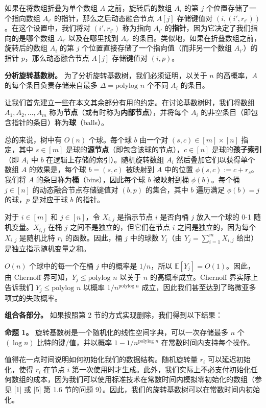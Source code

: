 \documentclass[12pt,a4paper]{ctexart}
\theoremstyle{remark}
\begin{document}
如果在将数组折叠为单个数组 $A$ 之前，旋转后的数组 $A_i$ 的第 $j$ 个位置存储了一个指向数组 $A_{i'}$ 的指针，那么之后动态融合节点 $A[j]$ 存储键值对 $(i,(i',r_{i'}))$。在这个设置中，我们将对 $(i',r_{i'})$ 称为指向 $A_{i'}$ 的\textbf{指针}，因为它决定了我们指向的是哪个数组 $A_{i'}$ 以及在哪里找到 $A_{i'}$ 的条目。类似地，如果在折叠数组之前，旋转后的数组 $A_i$ 的第 $j$ 个位置直接存储了一个指向值（而非另一个数组 $A_{i'}$）的指针 $p$，那么动态融合节点 $A[j]$ 存储键值对 $(i,p)$。

\textbf{分析旋转基数树。} 为了分析旋转基数树，我们必须证明，以关于 $n$ 的高概率，$A$ 的每个条目负责存储来自最多 $\Delta=\text{polylog } n$ 个不同 $A_i$ 的条目。

让我们首先建立一些在本文其余部分有用的约定。在讨论基数树时，我们将数组 $A_1,A_2,\ldots,A_m$ 称为\textbf{节点}（或有时称为\textbf{内部节点}），并将每个 $A_i$ 的非空条目（即包含指针的条目）称为\textbf{球}（balls）。

总的来说，树中有 $O(n)$ 个球。每个球 $b$ 由一个对 $(s,c)\in[m]\times[n]$ 指定，其中 $s\in[m]$ 是球的\textbf{源节点}（即包含该球的节点），$c\in[n]$ 是球的\textbf{孩子索引}（即 $A_i$ 中 $b$ 在逻辑上存储的索引）。随机旋转数组 $A_i$ 然后叠加它们以获得单个数组 $A$ 的效果是，每个球 $b=(s,c)$ 被映射到 $A$ 中的位置 $\phi(s,c):=c+r_s$。我们将 $A$ 的条目称为\textbf{桶}（bins），因此每个球 $b$ 被映射到桶 $\phi(b)$。每个桶 $j\in[n]$ 的动态融合节点存储键值对 $(b,p)$ 的集合，其中 $b$ 遍历满足 $\phi(b)=j$ 的球，$p$ 是对应于球 $b$ 的指针。

对于 $i\in[m]$ 和 $j\in[n]$，令 $X_{i,j}$ 是指示节点 $i$ 是否向桶 $j$ 放入一个球的 0-1 随机变量。$X_{i,j}$ 在桶 $j$ 之间不是独立的，但它们在节点 $i$ 之间是独立的，因为每个 $X_{i,j}$ 是随机比特 $r_i$ 的函数。因此，桶 $j$ 中的球数 $Y_j$（由 $Y_j=\sum_{i=1}^{m}X_{i,j}$ 给出）是独立指示随机变量之和。

$O(n)$ 个球中的每一个在桶 $j$ 中的概率是 $1/n$，所以 $\mathbb{E}[Y_j]=O(1)$。因此，由 Chernoff 界可知，$Y_j\leq\text{polylog } n$ 以关于 $n$ 的高概率成立。Chernoff 界实际上告诉我们 $Y_j\leq\text{polylog } n$ 以概率 $1/n^{\text{polylog } n}$ 成立，因此我们甚至达到了略微亚多项式的失败概率。

\textbf{组合各部分。} 如果按照第 2 节的方式实现删除，我们得到以下结果：

\textbf{命题 1。} 旋转基数树是一个随机化的线性空间字典，可以一次存储最多 $n$ 个 $(\log n)$ 比特的键/值，并以概率 $1-1/n^{\text{polylog } n}$ 在常数时间内支持每个操作。

值得花一点时间说明如何初始化我们的数据结构。随机旋转量 $r_i$ 可以延迟初始化，使得 $r_i$ 在节点 $i$ 第一次使用时才生成。此外，我们实际上不必支付初始化任何数组的成本，因为我们可以使用标准技术在常数时间内模拟零初始化的数组（参见 [1] 或 [5] 第 1.6 节的问题 9）。因此，我们的旋转基数树可以在常数时间内初始化。
\end{document}
